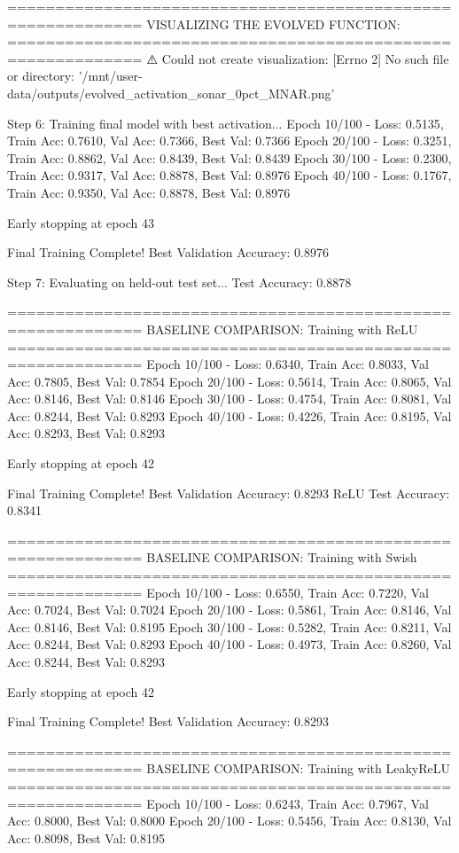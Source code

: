 ============================================================
VISUALIZING THE EVOLVED FUNCTION:
============================================================
⚠️ Could not create visualization: [Errno 2] No such file or directory: '/mnt/user-data/outputs/evolved_activation_sonar_0pct_MNAR.png'

Step 6: Training final model with best activation...
Epoch  10/100 - Loss: 0.5135, Train Acc: 0.7610, Val Acc: 0.7366, Best Val: 0.7366
Epoch  20/100 - Loss: 0.3251, Train Acc: 0.8862, Val Acc: 0.8439, Best Val: 0.8439
Epoch  30/100 - Loss: 0.2300, Train Acc: 0.9317, Val Acc: 0.8878, Best Val: 0.8976
Epoch  40/100 - Loss: 0.1767, Train Acc: 0.9350, Val Acc: 0.8878, Best Val: 0.8976

Early stopping at epoch 43

Final Training Complete!
Best Validation Accuracy: 0.8976

Step 7: Evaluating on held-out test set...
Test Accuracy: 0.8878

============================================================
BASELINE COMPARISON: Training with ReLU
============================================================
Epoch  10/100 - Loss: 0.6340, Train Acc: 0.8033, Val Acc: 0.7805, Best Val: 0.7854
Epoch  20/100 - Loss: 0.5614, Train Acc: 0.8065, Val Acc: 0.8146, Best Val: 0.8146
Epoch  30/100 - Loss: 0.4754, Train Acc: 0.8081, Val Acc: 0.8244, Best Val: 0.8293
Epoch  40/100 - Loss: 0.4226, Train Acc: 0.8195, Val Acc: 0.8293, Best Val: 0.8293

Early stopping at epoch 42

Final Training Complete!
Best Validation Accuracy: 0.8293
ReLU Test Accuracy: 0.8341

============================================================
BASELINE COMPARISON: Training with Swish
============================================================
Epoch  10/100 - Loss: 0.6550, Train Acc: 0.7220, Val Acc: 0.7024, Best Val: 0.7024
Epoch  20/100 - Loss: 0.5861, Train Acc: 0.8146, Val Acc: 0.8146, Best Val: 0.8195
Epoch  30/100 - Loss: 0.5282, Train Acc: 0.8211, Val Acc: 0.8244, Best Val: 0.8293
Epoch  40/100 - Loss: 0.4973, Train Acc: 0.8260, Val Acc: 0.8244, Best Val: 0.8293

Early stopping at epoch 42

Final Training Complete!
Best Validation Accuracy: 0.8293

============================================================
BASELINE COMPARISON: Training with LeakyReLU
============================================================
Epoch  10/100 - Loss: 0.6243, Train Acc: 0.7967, Val Acc: 0.8000, Best Val: 0.8000
Epoch  20/100 - Loss: 0.5456, Train Acc: 0.8130, Val Acc: 0.8098, Best Val: 0.8195

